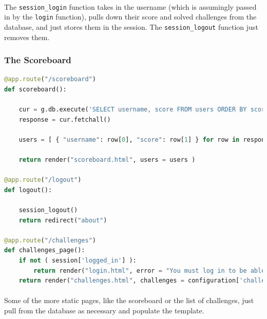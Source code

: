 \documentclass[11pt]{article}
\begin{document}
	\paragraph{} The \texttt{session\_login} function takes in the username (which is assumingly passed in by the \texttt{login} function), pulls down their score and solved challenges from the database, and just stores them in the session. The \texttt{session\_logout} function just removes them.

	\paragraph{}


	\begin{center}
		\graphicspath{ {.} }
		\centering
	\end{center}
	
	\newpage


	\subsubsection{The Scoreboard}

	\begin{lstlisting}[language=Python]
@app.route("/scoreboard")
def scoreboard(): 

	cur = g.db.execute('SELECT username, score FROM users ORDER BY score DESC, last_submission ASC')	
	response = cur.fetchall()	
	
	users = [ { "username": row[0], "score": row[1] } for row in response]
	
	return render("scoreboard.html", users = users )

@app.route("/logout")
def logout():

	session_logout()
	return redirect("about")

@app.route("/challenges")
def challenges_page(): 
	if not ( session['logged_in'] ):
		return render("login.html", error = "You must log in to be able to see the challenges!")	
	return render("challenges.html", challenges = configuration['challenges'])
\end{lstlisting}

	\paragraph{} Some of the more static pages, like the scoreboard or the list of challenges, just pull from the database as necessary and populate the template.
\end{document}
